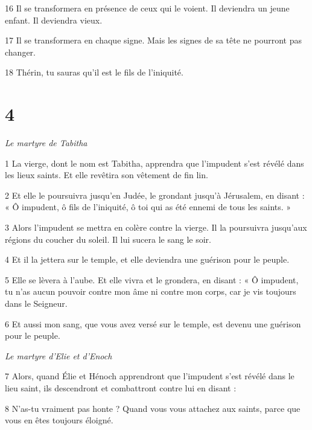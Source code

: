\par 16 Il se transformera en présence de ceux qui le voient. Il deviendra un jeune enfant. Il deviendra vieux.

\par 17 Il se transformera en chaque signe. Mais les signes de sa tête ne pourront pas changer.

\par 18 Thérin, tu sauras qu'il est le fils de l'iniquité.

\chapter{4}

\par \textit{Le martyre de Tabitha}

\par 1 La vierge, dont le nom est Tabitha, apprendra que l'impudent s'est révélé dans les lieux saints. Et elle revêtira son vêtement de fin lin.

\par 2 Et elle le poursuivra jusqu'en Judée, le grondant jusqu'à Jérusalem, en disant : « Ô impudent, ô fils de l'iniquité, ô toi qui as été ennemi de tous les saints. »

\par 3 Alors l'impudent se mettra en colère contre la vierge. Il la poursuivra jusqu'aux régions du coucher du soleil. Il lui sucera le sang le soir.

\par 4 Et il la jettera sur le temple, et elle deviendra une guérison pour le peuple.

\par 5 Elle se lèvera à l'aube. Et elle vivra et le grondera, en disant : « Ô impudent, tu n'as aucun pouvoir contre mon âme ni contre mon corps, car je vis toujours dans le Seigneur.

\par 6 Et aussi mon sang, que vous avez versé sur le temple, est devenu une guérison pour le peuple.


\par \textit{Le martyre d'Elie et d'Enoch}

\par 7 Alors, quand Élie et Hénoch apprendront que l'impudent s'est révélé dans le lieu saint, ils descendront et combattront contre lui en disant :

\par 8 N'as-tu vraiment pas honte ? Quand vous vous attachez aux saints, parce que vous en êtes toujours éloigné.

